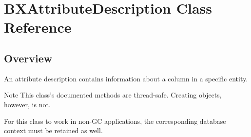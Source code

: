 \hypertarget{interface_b_x_attribute_description}{}\section{B\+X\+Attribute\+Description Class Reference}
\label{interface_b_x_attribute_description}


\subsection{Overview}
An attribute description contains information about a column in a specific entity. 

\begin{DoxyNote}{Note}
This class's documented methods are thread-\/safe. Creating objects, however, is not. 

For this class to work in non-\/\+G\+C applications, the corresponding database context must be retained as well. 
\end{DoxyNote}
